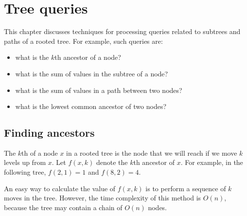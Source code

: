 \chapter{Tree queries}


This chapter discusses techniques for
processing queries related
to subtrees and paths of a rooted tree.
For example, such queries are:

\begin{itemize}
\item what is the $k$th ancestor of a node?
\item what is the sum of values in the subtree of a node?
\item what is the sum of values in a path between two nodes?
\item what is the lowest common ancestor of two nodes?
\end{itemize}

\section{Finding ancestors}


The $k$th  of a node $x$ in a rooted tree
is the node that we will reach if we move $k$
levels up from $x$.
Let $f(x,k)$ denote the $k$th ancestor of $x$.
For example, in the following tree, $f(2,1)=1$ and $f(8,2)=4$.

\begin{center}
\end{center}

An easy way to calculate the value of $f(x,k)$
is to perform a sequence of $k$ moves in the tree.
However, the time complexity of this method
is $O(n)$, because the tree may contain
a chain of $O(n)$ nodes.

